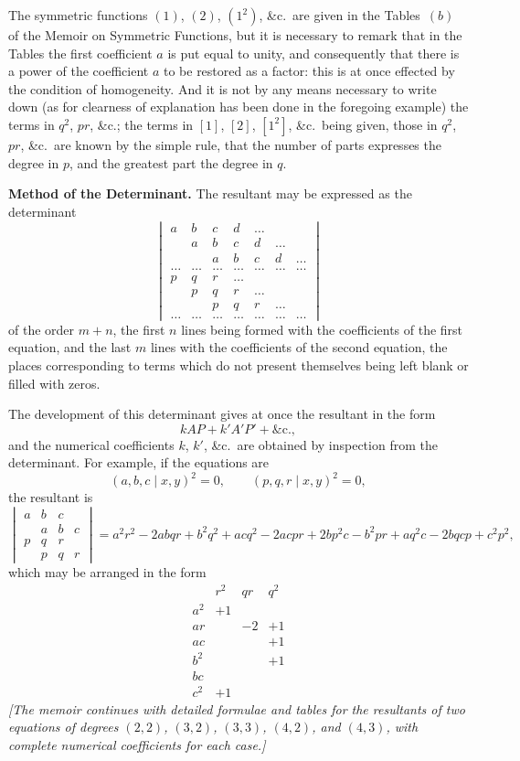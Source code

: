 \documentclass[11pt,a4paper]{article}
\begin{document}
The symmetric functions $(1)$, $(2)$, $(1^2)$, \&c.\ are given in the Tables~$(b)$
of the Memoir on Symmetric Functions, but it is necessary to remark that in
the Tables the first coefficient $a$ is put equal to unity, and consequently
that there is a power of the coefficient $a$ to be restored as a factor: this
is at once effected by the condition of homogeneity. And it is not by any
means necessary to write down (as for clearness of explanation has been done
in the foregoing example) the terms in $q^2$, $pr$, \&c.; the terms in $[1]$,
$[2]$, $[1^2]$, \&c.\ being given, those in $q^2$, $pr$, \&c.\ are known by
the simple rule, that the number of parts expresses the degree in $p$, and the
greatest part the degree in $q$.

\newpage
\textbf{Method of the Determinant.} The resultant may be expressed as the
determinant
\[
\begin{vmatrix}
a & b & c & d & \ldots \\
  & a & b & c & d & \ldots \\
  &   & a & b & c & d & \ldots \\
\ldots & \ldots & \ldots & \ldots & \ldots & \ldots & \ldots \\[-0.5em]
p & q & r & \ldots \\
  & p & q & r & \ldots \\
  &   & p & q & r & \ldots \\
\ldots & \ldots & \ldots & \ldots & \ldots & \ldots & \ldots
\end{vmatrix}
\]
of the order $m + n$, the first $n$ lines being formed with the coefficients
of the first equation, and the last $m$ lines with the coefficients of the
second equation, the places corresponding to terms which do not present
themselves being left blank or filled with zeros.

The development of this determinant gives at once the resultant in the form
\[
kAP + k'A'P' + \&\text{c.},
\]
and the numerical coefficients $k$, $k'$, \&c.\ are obtained by inspection from
the determinant. For example, if the equations are
\[
(a, b, c \mid x, y)^2 = 0, \qquad (p, q, r \mid x, y)^2 = 0,
\]
the resultant is
\[
\begin{vmatrix}
a & b & c \\
  & a & b & c \\
p & q & r \\
  & p & q & r
\end{vmatrix}
= a^2 r^2 - 2abqr + b^2 q^2 + acq^2 - 2acpr + 2bp^2 c - b^2 pr + aq^2 c
- 2bqcp + c^2 p^2,
\]
which may be arranged in the form
\[
\begin{array}{c|ccc}
& r^2 & qr & q^2 \\
\hline
a^2 & +1 \\
ar & & -2 & +1 \\
ac & & & +1 \\
b^2 & & & +1 \\
bc & & \\
c^2 & +1
\end{array}
\]
\textit{[The memoir continues with detailed formulae and tables for the
resultants of two equations of degrees $(2,2)$, $(3,2)$, $(3,3)$, $(4,2)$,
and $(4,3)$, with complete numerical coefficients for each case.]}
\end{document}
